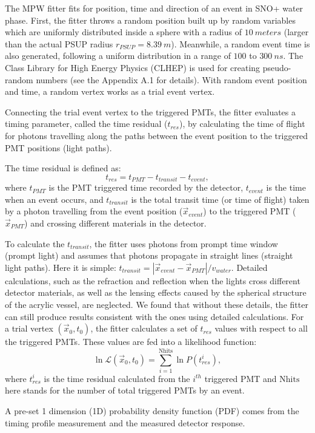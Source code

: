 The MPW fitter fits for position, time and direction of an event in SNO+ water phase. First, the fitter throws a random position built up by random variables which are uniformly distributed inside a sphere with a radius of $10~meters$ (larger than the actual PSUP radius $r_{PSUP}=8.39~m$).
Meanwhile, a random event time is also generated, following a uniform distribution in a range of $100$ to $300~ns$. The Class Library for High Energy Physics (CLHEP) is used for creating pseudo-random numbers (see the Appendix A.1 for details). With random event position and time, a random vertex works as a trial event vertex. 

Connecting the trial event vertex to the triggered PMTs, the fitter evaluates a timing parameter, called the time residual ($t_{res}$), by calculating the time of flight for photons travelling along the paths between the event position to the triggered PMT positions (light paths).

The time residual is defined as:
\[
t_{res}=t_{PMT} - t_{transit} - t_{event},
\]
where $t_{PMT}$ is the PMT triggered time recorded by the detector, $t_{event}$ is the time when an event occurs, and $t_{transit}$ is the total transit time (or time of flight) taken by a photon travelling from the event position ($\vec{x}_{event}$) to the triggered PMT ($\vec{x}_{PMT}$) and crossing different materials in the detector.

To calculate the $t_{transit}$, the fitter uses photons from prompt time window (prompt light) and assumes that photons propagate in straight lines (straight light paths). Here it is simple: $t_{transit}=|\vec{x}_{event}-\vec{x}_{PMT}|/v_{water}$. Detailed calculations, such as the refraction and reflection when the lights cross different detector materials, as well as the lensing effects caused by the spherical structure of the acrylic vessel, are neglected. We found that without these details, the fitter can still produce results consistent with the ones using detailed calculations. 
For a trial vertex $(\vec{x}_0,t_0)$, the fitter calculates a set of $t_{res}$ values with respect to all the triggered PMTs. These values are fed into a likelihood function: 
\[
\ln\mathcal{L}(\vec{x}_0,t_0)=\sum_{i=1}^{{\mathrm{Nhits}}}\ln P(t^i_{res}),
\]
where $t^i_{res}$ is the time residual calculated from the $i^{th}$ triggered PMT and $\mathrm{Nhits}$ here stands for the number of total triggered PMTs by an event.

A pre-set 1 dimension (1D) probability density function (PDF) comes from the timing profile measurement and the measured detector response.

